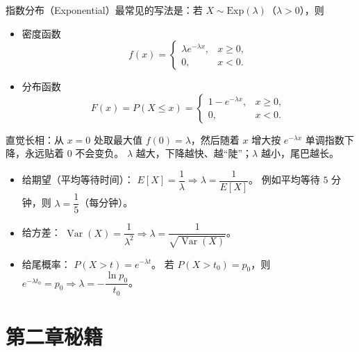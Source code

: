 \begin{note}
    指数分布（Exponential）最常见的写法是：若 $X\sim \mathrm{Exp}(\lambda)$（$\lambda>0$），则

\begin{itemize}
  \item 密度函数
  \[
  f(x)=
  \begin{cases}
  \lambda e^{-\lambda x}, & x\ge 0,\\
  0, & x<0.
  \end{cases}
  \]

  \item 分布函数
  \[
  F(x)=P(X\le x)=
  \begin{cases}
  1-e^{-\lambda x}, & x\ge 0,\\
  0, & x<0.
  \end{cases}
  \]
\end{itemize}

直觉长相：从 $x=0$ 处取最大值 $f(0)=\lambda$，然后随着 $x$ 增大按 $e^{-\lambda x}$ 单调指数下降，永远贴着 $0$ 不会变负。
$\lambda$ 越大，下降越快、越“陡”；$\lambda$ 越小，尾巴越长。
\end{note}
\begin{itemize}
  \item 给期望（平均等待时间）：
  $E[X]=\dfrac{1}{\lambda}\Rightarrow \lambda=\dfrac{1}{E[X]}$。
  例如平均等待 $5$ 分钟，则 $\lambda=\dfrac{1}{5}$（每分钟）。

  \item 给方差：
  $\operatorname{Var}(X)=\dfrac{1}{\lambda^2}\Rightarrow
  \lambda=\dfrac{1}{\sqrt{\operatorname{Var}(X)}}$。

  \item 给尾概率：
  $P(X>t)=e^{-\lambda t}$。
  若 $P(X>t_0)=p_0$，则
  $e^{-\lambda t_0}=p_0\Rightarrow
  \lambda=-\dfrac{\ln p_0}{t_0}$。
\end{itemize}
\chapter{第二章秘籍}
